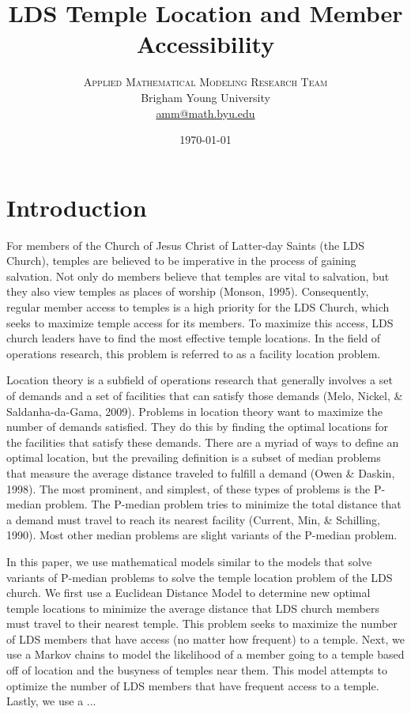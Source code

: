 \documentclass[twoside,twocolumn]{article}
\title{LDS Temple Location and Member Accessibility} %
\author{%
\textsc{Applied Mathematical Modeling Research Team}\\[1ex] %
\normalsize Brigham Young University  \\ %
\normalsize \href{mailto:amm@math.byu.edu}{amm@math.byu.edu} %
}
\date{\today} %
\begin{document}
\maketitle



\section{Introduction}

For members of the Church of Jesus Christ of Latter-day Saints (the LDS Church), temples are believed to be imperative in the process of gaining salvation.
Not only do members believe that temples are vital to salvation, but they also view temples as places of worship (Monson, 1995).
Consequently, regular member access to temples is a high priority for the LDS Church, which seeks to maximize temple access for its members.
To maximize this access, LDS church leaders have to find the most effective temple locations.
In the field of operations research, this problem is referred to as a facility location problem.

Location theory is a subfield of operations research that generally involves a set of demands and a set of facilities that can satisfy those demands (Melo, Nickel, \& Saldanha-da-Gama, 2009).
Problems in location theory want to maximize the number of demands satisfied.
They do this by finding the optimal locations for the facilities that satisfy these demands.
There are a myriad of ways to define an optimal location, but the prevailing definition is a subset of median problems that measure the average distance traveled to fulfill a demand (Owen \& Daskin, 1998). 
The most prominent, and simplest, of these types of problems is the P-median problem.
The P-median problem tries to minimize the total distance that a demand must travel to reach its nearest facility (Current, Min, \& Schilling, 1990).
Most other median problems are slight variants of the P-median problem.

In this paper, we use mathematical models similar to the models that solve variants of P-median problems to solve the temple location problem of the LDS church.
We first use a Euclidean Distance Model to determine new optimal temple locations to minimize the average distance that LDS church members must travel to their nearest temple.
This problem seeks to maximize the number of LDS members that have access (no matter how frequent) to a temple.
Next, we use a Markov chains to model the likelihood of a member going to a temple based off of location and the busyness of temples near them.
This model attempts to optimize the number of LDS members that have frequent access to a temple.
Lastly, we use a ... %
\end{document}
